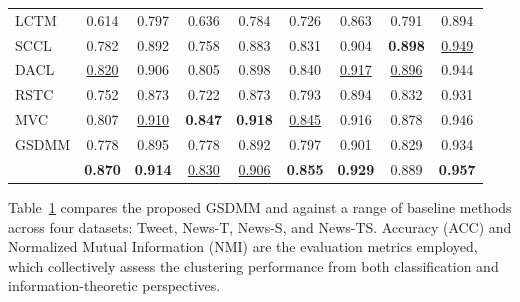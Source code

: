 \begin{table}[t]
\begin{tabular}{lcccccccc}
LCTM                     & 0.614        & 0.797              & 0.636        & 0.784              & 0.726        & 0.863              & 0.791        & 0.894               \\
SCCL                     & 0.782        & 0.892              & 0.758        & 0.883              & 0.831        & 0.904              & \textbf{0.898}        & \underline{0.949}               \\ 
DACL                     & \underline{0.820}         & 0.906              &0.805        & 0.898               & 0.840        & \underline{0.917}              & \underline{0.896}         & 0.944               \\ 
RSTC                     & 0.752        & 0.873              & 0.722        & 0.873               & 0.793        & 0.894              & 0.832        & 0.931               \\ 
MVC                      &0.807         & \underline{0.910}              & \textbf{0.847}        & \textbf{0.918}     
        & \underline{0.845}        & 0.916              & 0.878        & 0.946               \\ \hline
GSDMM                    & 0.778        & 0.895             & 0.778        & 0.892              & 0.797       & 0.901              & 0.829        & 0.934               \\
\sysname{}   & \textbf{0.870} & \textbf{0.914}     & \underline{0.830} & \underline{0.906}    & \textbf{0.855} & \textbf{0.929}     & 0.889 & \textbf{0.957}      \\ \hline
\end{tabular}
\label{tab:performance_comparison}
\end{table}

Table~\ref{tab:performance_comparison} compares the proposed GSDMM and \sysname{} against a range of baseline methods across four datasets: Tweet, News-T, News-S, and News-TS. Accuracy (ACC) and Normalized Mutual Information (NMI) are the evaluation metrics employed, which collectively assess the clustering performance from both classification and information-theoretic perspectives.

